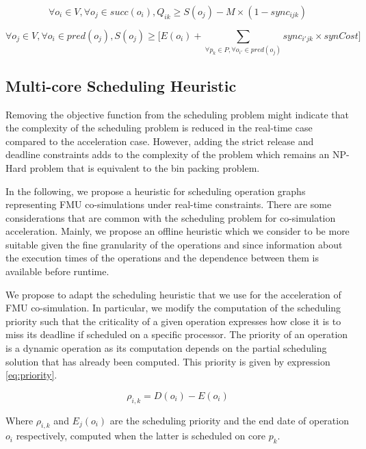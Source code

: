 \begin{equation}
\forall o_i \in V, \forall o_j \in succ(o_i), Q_{ik} \geq S(o_j) - M \times (1-sync_{ijk})
\label{schedRT:const_8}
\end{equation}

\begin{equation}
\forall o_j \in V, \forall o_i \in pred(o_j), S(o_j) \geq \Big[E(o_i) + \sum_{\forall p_k \in P, \forall o_{i'} \in pred(o_j)}sync_{i'jk}\times synCost\Big]
\label{schedRT:const_9}
\end{equation}

\subsection{Multi-core Scheduling Heuristic}

Removing the objective function from the scheduling problem might indicate that the complexity of the scheduling problem is reduced in the real-time case compared to the acceleration case. However, adding the strict release and deadline constraints adds to the complexity of the problem which remains an NP-Hard problem that is equivalent to the bin packing problem.

In the following, we propose a heuristic for scheduling operation graphs representing FMU co-simulations under real-time constraints. There are some considerations that are common with the scheduling problem for co-simulation acceleration. Mainly, we propose an offline heuristic which we consider to be more suitable given the fine granularity of the operations and since information about the execution times of the operations and the dependence between them is available before runtime.

We propose to adapt the scheduling heuristic that we use for the acceleration of FMU co-simulation. In particular, we modify the computation of the scheduling priority such that the criticality of a given operation expresses how close it is to miss its deadline if scheduled on a specific processor. The priority of an operation is a dynamic operation as its computation depends on the partial scheduling solution that has already been computed. This priority is given by expression \ref{eq:priority}.

\begin{equation}
\rho_{i,k} = D(o_i) - E(o_i)
\label{eq:priority}
\end{equation}

Where $\rho_{i,k}$ and $E_j(o_i)$ are the scheduling priority and the end date of operation $o_i$ respectively, computed when the latter is scheduled on core $p_k$.

